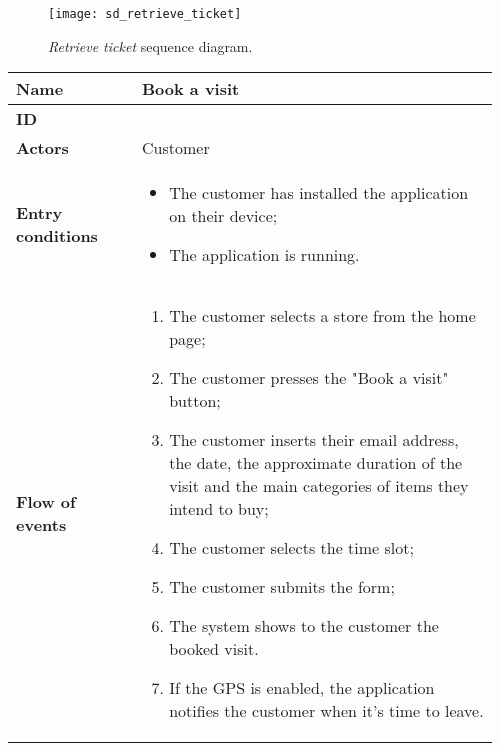 	\begin{figure}[H]
		\centering
		\texttt{[image: sd\_retrieve\_ticket]}
		\caption{\textit{Retrieve ticket} sequence diagram.}
	\end{figure}

	\begin{table}[H]
    	\centering
    	\begin{tabular}{@{}p{0.25\linewidth}p{0.71\linewidth}@{}}
    		\toprule
    		\textbf{Name} & Book a visit \\

    		\midrule
    		\textbf{ID} & \usecaseindex{uc:bookVisit} ~\\
    		\midrule
    		\textbf{Actors} & Customer \\
    		\midrule
    		\textbf{Entry conditions} &
    		\begin{itemize}[leftmargin=.4cm,noitemsep,topsep=0pt,before=\vspace{-3mm},after=\vspace{-4mm}]
    			\item The customer has installed the application on their device;
    			\item The application is running.
    		\end{itemize} \\
    		\midrule
    		\textbf{Flow of events} &
    		\begin{enumerate}[label=\roman*.,leftmargin=.5cm,noitemsep,topsep=0pt,before=\vspace{-3mm},after=\vspace{-4mm}]
    			\item The customer selects a store from the home page;
    			\item The customer presses the "Book a visit" button;
    			\item The customer inserts their email address, the date, the approximate duration of the visit and the main categories of items they intend to buy;
    			\item The customer selects the time slot;
                \item The customer submits the form;
                \item The system shows to the customer the booked visit.
                \item If the GPS is enabled, the application notifies the customer when it's time to leave.
    		\end{enumerate} \\
    		\midrule

\end{tabular}
\end{table}
